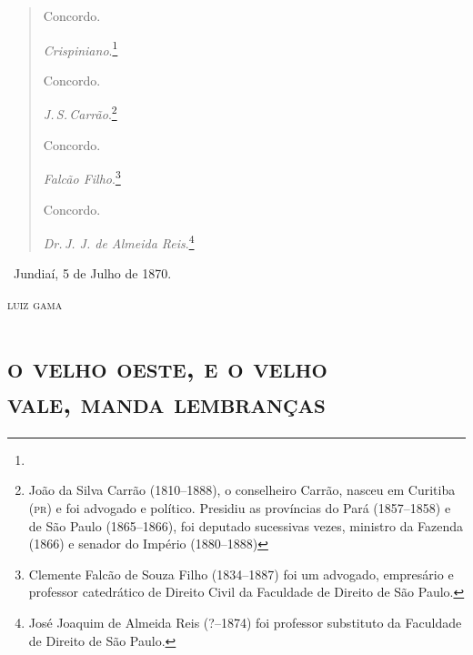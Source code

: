 \begin{quote}
Concordo.

\qquad\emph{Crispiniano}.\footnote{}\bigskip

Concordo.

\qquad\emph{J.\,S.\,Carrão}.\footnote{João da Silva Carrão (1810--1888), o
  conselheiro Carrão, nasceu em Curitiba (\textsc{pr}) e foi advogado e político.
  Presidiu as províncias do Pará (1857--1858) e de São Paulo (1865--1866),
  foi deputado sucessivas vezes, ministro da Fazenda (1866) e senador do
  Império (1880--1888)}\bigskip

Concordo.

\qquad\emph{Falcão Filho}.\footnote{Clemente Falcão de Souza Filho
  (1834--1887) foi um advogado, empresário e professor catedrático de
  Direito Civil da Faculdade de Direito de São Paulo.}\bigskip

Concordo.

\qquad\emph{Dr.\,J. J. de Almeida Reis}.\footnote{José Joaquim de Almeida Reis
  (?--1874) foi professor substituto da Faculdade de Direito de São
  Paulo.}
\end{quote}

\hfill\ Jundiaí, 5 de Julho de 1870.\smallskip

\hfill\textsc{luiz gama}

\pagebreak

\begingroup\makeatletter\@openrightfalse
\part[O velho oeste, e o velho vale, manda lembranças]{\textsc{o velho oeste, e o velho\\ vale, manda lembranças}}

\mbox{}\vfill
\thispagestyle{empty}

